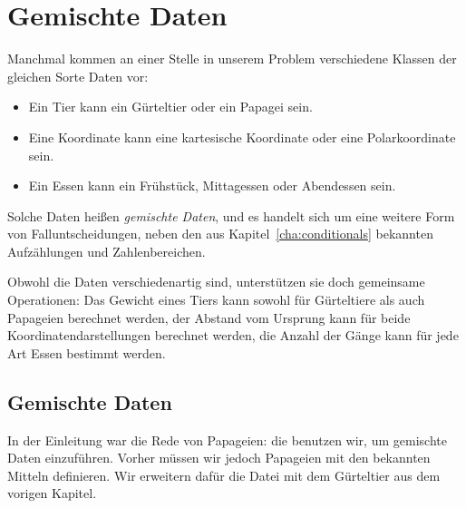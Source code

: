 
\chapter{Gemischte Daten}
\label{cha:gemischte-daten}

Manchmal kommen an einer Stelle in unserem Problem verschiedene
Klassen der gleichen Sorte Daten vor:
%
\begin{itemize}
\item Ein Tier kann ein Gürteltier oder ein Papagei sein.
\item Eine Koordinate kann eine kartesische Koordinate oder eine
  Polarkoordinate sein.
\item Ein Essen kann ein Frühstück, Mittagessen oder Abendessen sein.
\end{itemize}
%
Solche Daten heißen \textit{gemischte Daten}, und es handelt sich um eine weitere Form von
Falluntscheidungen, neben den aus Kapitel~\ref{cha:conditionals}
bekannten Aufzählungen und Zahlenbereichen.

Obwohl die Daten verschiedenartig sind, unterstützen sie doch
gemeinsame Operationen: Das Gewicht eines Tiers kann sowohl für
Gürteltiere als auch Papageien berechnet werden, der Abstand vom
Ursprung kann für beide Koordinatendarstellungen berechnet werden, die
Anzahl der Gänge kann für jede Art Essen bestimmt werden.

\section{Gemischte Daten}
\label{sec:mixed-data}
\label{sec:animal}

%
In der Einleitung war die Rede von Papageien: die benutzen wir, um
gemischte Daten einzuführen.  Vorher müssen wir jedoch Papageien mit den bekannten
Mitteln definieren.  Wir erweitern dafür die Datei mit dem Gürteltier
aus dem vorigen Kapitel.

